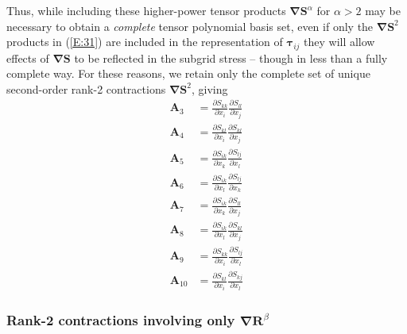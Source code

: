 Thus, while including these higher-power tensor products $\mathbf{\nabla S}^{\alpha}$   for $\alpha > 2$  may be necessary to obtain a \textit{complete} tensor polynomial basis set, even if only the $\mathbf{\nabla S}^2$   products in (\ref{E:31}) are included in the representation of $\mathbf{\tau}_{ij}$  they will allow effects of $\mathbf{\nabla S}$   to be reflected in the subgrid stress – though in less than a fully complete way.  For these reasons, we retain only the complete set of unique second-order rank-2 contractions $\mathbf{\nabla S}^2$, giving
%
\begin{subequations}
\label{E:33}
\begin{align}
	\mathbf{A}_3  &= \frac{\partial S_{kk}}{\partial x_i}
					 \frac{\partial S_{ll}}{\partial x_j} \\
	\mathbf{A}_4  &= \frac{\partial S_{kl}}{\partial x_i}
					 \frac{\partial S_{kl}}{\partial x_j} \\
	\mathbf{A}_5  &= \frac{\partial S_{ik}}{\partial x_k}
					 \frac{\partial S_{lj}}{\partial x_l} \\
	\mathbf{A}_6  &= \frac{\partial S_{ik}}{\partial x_l}
					 \frac{\partial S_{lj}}{\partial x_k} \\
	\mathbf{A}_7  &= \frac{\partial S_{ik}}{\partial x_k}
					 \frac{\partial S_{ll}}{\partial x_j} \\
	\mathbf{A}_8  &= \frac{\partial S_{ik}}{\partial x_l}
					 \frac{\partial S_{kl}}{\partial x_j} \\
	\mathbf{A}_9  &= \frac{\partial S_{kk}}{\partial x_i}
					 \frac{\partial S_{lj}}{\partial x_l} \\
	\mathbf{A}_{10} &= \frac{\partial S_{kl}}{\partial x_i}
				     \frac{\partial S_{kj}}{\partial x_l}      
\end{align}
\end{subequations}
%
%    
	 	
\subsubsection{Rank-2 contractions involving only $\mathbf{\nabla R}^{\beta}$}
\label{sec:2C2}

